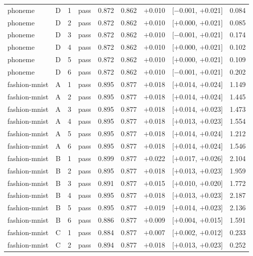 {\begin{longtable}{lccl rrrcr}
\addlinespace[2pt]
phoneme & D & 1 & pass & 0.872 & 0.862 & $+$0.010 & [$-$0.001, $+$0.021] & 0.084 \\
phoneme & D & 2 & pass & 0.872 & 0.862 & $+$0.010 & [$+$0.000, $+$0.021] & 0.085 \\
phoneme & D & 3 & pass & 0.872 & 0.862 & $+$0.010 & [$-$0.001, $+$0.021] & 0.174 \\
phoneme & D & 4 & pass & 0.872 & 0.862 & $+$0.010 & [$+$0.000, $+$0.021] & 0.102 \\
phoneme & D & 5 & pass & 0.872 & 0.862 & $+$0.010 & [$+$0.000, $+$0.021] & 0.109 \\
phoneme & D & 6 & pass & 0.872 & 0.862 & $+$0.010 & [$-$0.001, $+$0.021] & 0.202 \\
\midrule
fashion-mnist & A & 1 & pass & 0.895 & 0.877 & $+$0.018 & [$+$0.014, $+$0.024] & 1.149 \\
fashion-mnist & A & 2 & pass & 0.895 & 0.877 & $+$0.018 & [$+$0.014, $+$0.024] & 1.445 \\
fashion-mnist & A & 3 & pass & 0.895 & 0.877 & $+$0.018 & [$+$0.014, $+$0.023] & 1.473 \\
fashion-mnist & A & 4 & pass & 0.895 & 0.877 & $+$0.018 & [$+$0.013, $+$0.023] & 1.554 \\
fashion-mnist & A & 5 & pass & 0.895 & 0.877 & $+$0.018 & [$+$0.014, $+$0.024] & 1.212 \\
fashion-mnist & A & 6 & pass & 0.895 & 0.877 & $+$0.018 & [$+$0.014, $+$0.024] & 1.546 \\
\addlinespace[2pt]
fashion-mnist & B & 1 & pass & 0.899 & 0.877 & $+$0.022 & [$+$0.017, $+$0.026] & 2.104 \\
fashion-mnist & B & 2 & pass & 0.895 & 0.877 & $+$0.018 & [$+$0.013, $+$0.023] & 1.959 \\
fashion-mnist & B & 3 & pass & 0.891 & 0.877 & $+$0.015 & [$+$0.010, $+$0.020] & 1.772 \\
fashion-mnist & B & 4 & pass & 0.895 & 0.877 & $+$0.018 & [$+$0.013, $+$0.023] & 2.187 \\
fashion-mnist & B & 5 & pass & 0.895 & 0.877 & $+$0.019 & [$+$0.014, $+$0.023] & 2.136 \\
fashion-mnist & B & 6 & pass & 0.886 & 0.877 & $+$0.009 & [$+$0.004, $+$0.015] & 1.591 \\
\addlinespace[2pt]
fashion-mnist & C & 1 & pass & 0.884 & 0.877 & $+$0.007 & [$+$0.002, $+$0.012] & 0.233 \\
fashion-mnist & C & 2 & pass & 0.894 & 0.877 & $+$0.018 & [$+$0.013, $+$0.023] & 0.252 \\

\end{longtable}}
